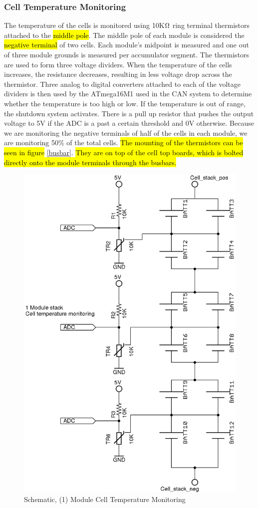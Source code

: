 \documentclass{article}
\DeclareRobustCommand{\hlr}[1]{{\sethlcolor{red}\hl{#1}}}
\begin{document}
        \subsubsection{Cell Temperature Monitoring} %


            The temperature of the cells is monitored using 10K$\ohm$ ring terminal thermistors attached to the \hlr{middle pole}. The middle pole of each module is considered the \hlr{negative terminal} of two cells. Each module’s midpoint is measured and one out of three module grounds is measured per accumulator segment. The thermistors are used to form three voltage dividers. When the temperature of the cells increases, the resistance decreases, resulting in less voltage drop across the thermistor. Three analog to digital converters attached to each of the voltage dividers is then used by the ATmega16M1 used in the CAN system to determine whether the temperature is too high or low. If the temperature is out of range, the shutdown system activates. There is a pull up resistor that pushes the output voltage to 5V if the ADC is a past a certain threshold and 0V otherwise. Because we are monitoring the negative terminals of half of the cells in each module, we are monitoring 50\% of the total cells.
            \hlr{The mounting of the thermistors can be seen in figure} \ref{busbar}. \hlr{They are on top of the cell top boards, which is bolted directly onto the module terminals through the busbars.}


            \begin{figure}[H]
                \centering
                \includegraphics[width = 0.4 \textwidth]{celltemp}
                \caption{Schematic, (1) Module Cell Temperature Monitoring}
                \label{celltemp}
            \end{figure}
\end{document}
